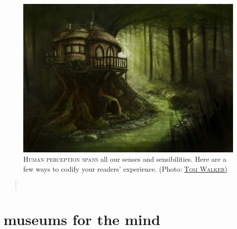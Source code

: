 \begin{figure}[h]                                                           
 \includegraphics[width=\linewidth]{./media/images/article_one_splash}%
  \small{\textsc{\\ Human perception spans} all our senses and sensibilities.
    Here are a few ways to codify your readers' experience. (Photo: \href{https://www.deviantart.com/tomallica}{\textsc{Tom Walker)}}}
  \label{fig:bridge}%
\end{figure}                                                                
\begin{quotation} 
\noindent{}\\[2mm]
   \hfill{}
\end{quotation} 

\section{museums for the mind}

